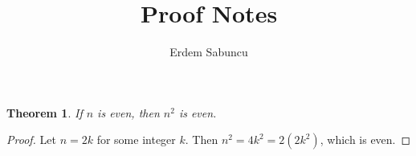 \documentclass{article}
\title{Proof Notes}
\author{Erdem Sabuncu}
\newtheorem{theorem}{Theorem}
\begin{document}
\maketitle

\begin{theorem}
If $n$ is even, then $n^2$ is even.
\end{theorem}

\begin{proof}
Let $n = 2k$ for some integer $k$. Then $n^2 = 4k^2 = 2(2k^2)$, which is even.
\end{proof}
\end{document}

